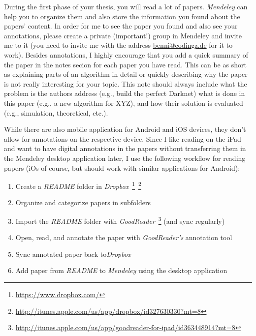 \documentclass{article}
\begin{document}
During the first phase of your thesis, you will read a lot of papers.
\emph{Mendeley} can help you to organize them and also store the information you found about the papers' content.
In order for me to see the paper you found and also see your annotations, please create a private (important!) group in Mendeley and invite me to it (you need to invite me with the address \url{benni@codingz.de} for it to work).
Besides annotations, I highly encourage that you add a quick summary of the paper in the notes secion for each paper you have read.
This can be as short as explaining parts of an algorithm in detail or quickly describing why the paper is not really interesting for your topic.
This note should always include what the problem is the authors address (e.g., build the perfect Darknet) what is done in this paper (e.g., a new algorithm for XYZ), and how their solution is evaluated (e.g., simulation, theoretical, etc.).

While there are also mobile application for Android and iOS devices, they don't allow for annotations on the respective device.
Since I like reading on the iPad and want to have digital annotations in the papers without transferring them in the Mendeley desktop application later, I use the following workflow for reading papers (iOs of course, but should work with similar applications for Android):

\begin{enumerate}
	\item Create a \emph{README} folder in \emph{Dropbox}~\footnote{\url{https://www.dropbox.com/}}~\footnote{\url{http://itunes.apple.com/us/app/dropbox/id327630330?mt=8}}
	\item Organize and categorize papers in subfolders
	\item Import the \emph{README} folder with \emph{GoodReader}~\footnote{\url{http://itunes.apple.com/us/app/goodreader-for-ipad/id363448914?mt=8}} (and sync regularly)
	\item Open, read, and annotate the paper with \emph{GoodReader's} annotation tool
	\item Sync annotated paper back to\emph{Dropbox}
	\item Add paper from \emph{README} to \emph{Mendeley} using the desktop application
\end{enumerate}
\end{document}
